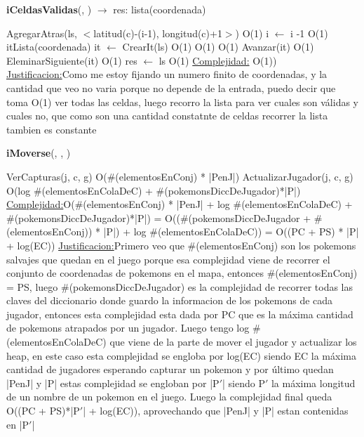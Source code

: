 \begin{Algoritmos}
\begin{algorithm}[H]{\textbf{iCeldasValidas}(, ) $\to$ res: lista(coordenada)}
\begin{algorithmic}[1]
				\State AgregarAtras(ls, $<$latitud(c)-(i-1), longitud(c)+1$>$) \Comment O(1)
			\EndIf			
			\State i $\gets$ i -1 \Comment O(1) 
		\EndWhile
		\State itLista(coordenada) it $\gets$ CrearIt(ls) \Comment O(1)		
		 \Comment O(1)
			 \Comment O(1)
				\State Avanzar(it) \Comment O(1) 
			\Else
				\State EleminarSiguiente(it) \Comment O(1)			
			\EndIf
		\EndWhile
		\State res $\gets$ ls \Comment O(1)
		\medskip
		\Statex \underline{Complejidad:} O(1))
		\Statex \underline{Justificacion:}Como me estoy fijando un numero finito de coordenadas, y la cantidad que veo no varia porque no depende de la entrada, puedo decir que toma O(1) ver todas las celdas, luego recorro la lista para ver cuales son válidas y cuales no, que como son una cantidad constatnte de celdas recorrer la lista tambien es constante
	\end{algorithmic}
\end{algorithm}

\begin{algorithm}[H]{\textbf{iMoverse}(, , )}
	\begin{algorithmic}[1]
		\State VerCapturas(j, c, g) \Comment O($\#$(elementosEnConj) * |PenJ|)
		\State ActualizarJugador(j, c, g) \Comment O(log $\#$(elementosEnColaDeC) +  $\#$(pokemonsDiccDeJugador)*|P|)
		\medskip
		\Statex \underline{Complejidad:}O($\#$(elementosEnConj) * |PenJ| + log $\#$(elementosEnColaDeC) + $\#$(pokemonsDiccDeJugador)*|P|) = O(($\#$(pokemonsDiccDeJugador + $\#$(elementosEnConj)) * |P|) + log $\#$(elementosEnColaDeC)) = O((PC + PS) * |P| + log(EC))
		\Statex \underline{Justificacion:}Primero veo que $\#$(elementosEnConj) son los pokemons salvajes que quedan en el juego porque esa complejidad viene de recorrer el conjunto de coordenadas de pokemons en el mapa, entonces $\#$(elementosEnConj) = PS, luego $\#$(pokemonsDiccDeJugador) es la complejidad de recorrer todas las claves del diccionario donde guardo la informacion de los pokemons de cada jugador, entonces esta complejidad esta dada por PC que es la máxima cantidad de pokemons atrapados por un jugador. Luego tengo log $\#$(elementosEnColaDeC) que viene de la parte de mover el jugador y actualizar los heap, en este caso esta complejidad se engloba por log(EC) siendo EC la máxima cantidad de jugadores esperando capturar un pokemon y por último quedan |PenJ| y |P| estas complejidad se engloban por |P$'$| siendo P$'$ la máxima longitud de un nombre de un pokemon en el juego. Luego la complejidad final queda O((PC + PS)*|P$'$| + log(EC)), aprovechando que |PenJ| y |P| estan contenidas en |P$'$|   
	\end{algorithmic}
\end{algorithm}


\end{Algoritmos}
